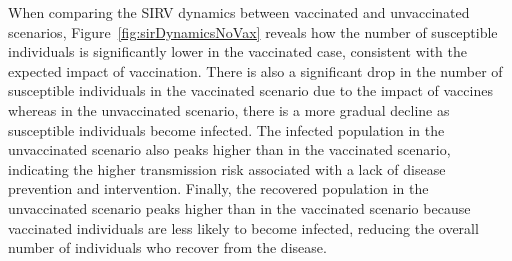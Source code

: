 \documentclass{article}
\begin{document}
When comparing the SIRV dynamics between vaccinated and unvaccinated scenarios, Figure~\ref{fig:sirDynamicsNoVax} reveals how the number of susceptible individuals is significantly lower in the vaccinated case, consistent with the expected impact of vaccination. There is also a significant drop in the number of susceptible individuals in the vaccinated scenario due to the impact of vaccines whereas in the unvaccinated scenario, there is a more gradual decline as susceptible individuals become infected. The infected population in the unvaccinated scenario also peaks higher than in the vaccinated scenario, indicating the higher transmission risk associated with a lack of disease prevention and intervention. Finally, the recovered population in the unvaccinated scenario peaks higher than in the vaccinated scenario because vaccinated individuals are less likely to become infected, reducing the overall number of individuals who recover from the disease.
\end{document}
